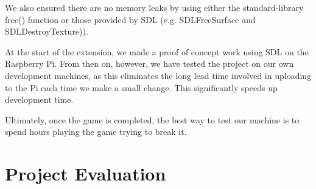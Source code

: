\documentclass[11pt,twoside]{article}
\begin{document}
We also ensured there are no memory leaks by using either the standard-library free() function or those provided by SDL (e.g. SDL\textunderscore FreeSurface and SDL\textunderscore DestroyTexture)).

At the start of the extension, we made a proof of concept work using SDL on the Raspberry Pi. From then on, however, we have tested the project on our own development machines, as this eliminates the long lead time involved in uploading to the Pi each time we make a small change. This significantly speeds up development time.

Ultimately, once the game is completed, the best way to test our machine is to spend hours playing the game trying to break it.

\section{Project Evaluation}
\end{document}
